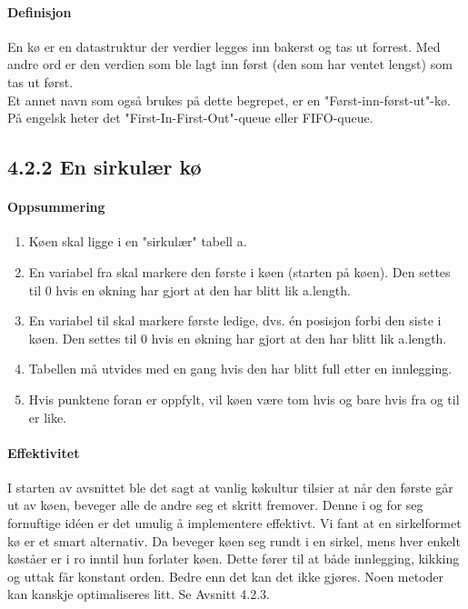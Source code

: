 \documentclass[11pt]{article}
\begin{document}
        \paragraph{Definisjon}
        En kø er en datastruktur der verdier legges inn bakerst og tas ut
        forrest. Med andre ord er den verdien som ble lagt inn først (den som har ventet
        lengst) som tas ut først.\\

        Et annet navn som også brukes på dette begrepet, er en "Først-inn-først-ut"-kø. På engelsk
        heter det "First-In-First-Out"-queue eller FIFO-queue.

    \subsection{4.2.2 En sirkulær kø}
        \paragraph{Oppsummering}
        \begin{enumerate}
            \item  Køen skal ligge i en "sirkulær" tabell a.
            \item En variabel fra skal markere den første i køen (starten på køen). Den settes til 0 hvis
                en økning har gjort at den har blitt lik a.length.
            \item En variabel til skal markere første ledige, dvs. én posisjon forbi den siste i køen. Den
                settes til 0 hvis en økning har gjort at den har blitt lik a.length.
            \item Tabellen må utvides med en gang hvis den har blitt full etter en innlegging.
            \item  Hvis punktene foran er oppfylt, vil køen være tom hvis og bare hvis fra og til er like.
        \end{enumerate}

        \paragraph{Effektivitet}
        I starten av avsnittet ble det sagt at vanlig køkultur tilsier at når den første
        går ut av køen, beveger alle de andre seg et skritt fremover. Denne i og for seg fornuftige
        idéen er det umulig å implementere effektivt. Vi fant at en sirkelformet kø er et smart
        alternativ. Da beveger køen seg rundt i en sirkel, mens hver enkelt køståer er i ro inntil hun
        forlater køen. Dette fører til at både innlegging, kikking og uttak får konstant orden. Bedre
        enn det kan det ikke gjøres. Noen metoder kan kanskje optimaliseres litt. Se Avsnitt 4.2.3.
\end{document}
